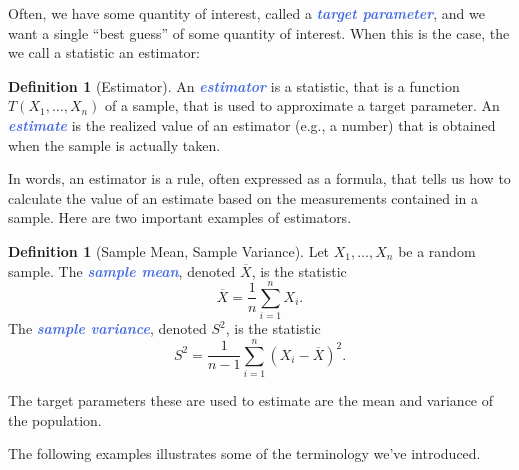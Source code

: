 \documentclass[10pt]{article}
\theoremstyle{definition}
\newtheorem{definition}[theorem]{Definition}
\newcommand{\1}[1]{\textbf{1}_{\left[#1\right]}} %
\newcommand{\demph}[1]{\textcolor{RoyalBlue}{\textbf{\slshape #1}}} %
\begin{document}
Often, we have some quantity of interest, called a \demph{target parameter},
and we want a single ``best guess'' of some quantity of interest. When this is
the case, the we call a statistic an estimator:

\begin{definition}[Estimator]
  \label{def:estimator}
  An \demph{estimator} is a statistic, that is a function
  $T(X_{1},\ldots,X_{n})$ of a sample, that is used to approximate a target
  parameter.
  An \demph{estimate} is the realized value of an
  estimator (e.g., a number) that is obtained when the sample is actually
  taken.
\end{definition}
In words, an estimator is a rule, often expressed as a formula, that tells us
how to calculate the value of an estimate based on the measurements contained
in a sample. Here are two important examples of estimators.

\begin{definition}[Sample Mean, Sample Variance]
  Let $X_{1},\ldots,X_{n}$ be a random sample. The \demph{sample mean},
  denoted $\overline{X}$, is the statistic
  \begin{equation*}
    \overline{X} = \frac{1}{n}\sum_{i=1}^{n}X_{i}.
  \end{equation*}
  The \demph{sample variance}, denoted $S^{2}$, is the statistic
  \begin{equation*}
    S^{2} = \frac{1}{n-1} \sum_{i=1}^{n} (X_{i}-\overline{X})^{2}.
  \end{equation*}
\end{definition}

The target parameters these are used to estimate are the mean and variance of
the population.


The following examples illustrates some of the terminology we've introduced.
\end{document}
